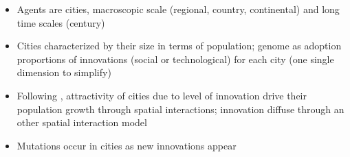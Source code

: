 {%

\begin{itemize}
	\item Agents are cities, macroscopic scale (regional, country, continental) and long time scales (century)
	\item Cities characterized by their size in terms of population; genome as adoption proportions of innovations (social or technological) for each city (one single dimension to simplify)
	\item Following \cite{favaro2011gibrat}, attractivity of cities due to level of innovation drive their population growth through spatial interactions; innovation diffuse through an other spatial interaction model \cite{fotheringham1989spatial}
	\item Mutations occur in cities as new innovations appear
\end{itemize}


}



